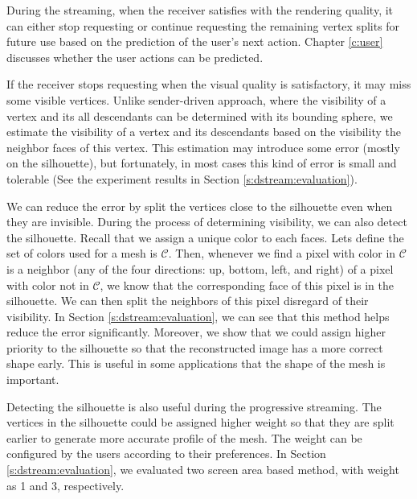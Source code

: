     During the streaming, when the receiver satisfies with the rendering quality, it 
    can either stop requesting or continue requesting the remaining vertex splits
    for future use based on the prediction of the user's next action.
    Chapter \ref{c:user} discusses whether the user actions can be predicted.

    If the receiver stops requesting %
    when the visual quality is satisfactory, it may miss some visible vertices.
    Unlike sender-driven approach, where the visibility of a vertex and its all descendants
    can be determined with its bounding sphere, we estimate the visibility of 
    a vertex and its descendants based on the visibility the neighbor faces of this vertex. 
    This estimation may introduce some error (mostly on the silhouette), 
    but fortunately, in most cases this kind of error is small and tolerable
    (See the experiment results in Section \ref{s:dstream:evaluation}).

    We can reduce the error by split the vertices close to the silhouette even 
    when they are invisible. During the process of determining visibility, we can also
    detect the silhouette. Recall that we assign a unique color to each faces.
    Lets define the set of colors used for a mesh is $\mathcal{C}$.  
    Then, whenever we find a pixel with color in $\mathcal{C}$ 
    is a neighbor (any of the four directions: up, bottom, left, and right)
    of a pixel with color not in $\mathcal{C}$, 
    we know that the corresponding face of this pixel is in the silhouette.
    We can then split the neighbors of this pixel disregard of their visibility.
    In Section \ref{s:dstream:evaluation}, we can see that this method helps
    reduce the error significantly. Moreover, we show that we could assign
    higher priority to the silhouette so that the reconstructed image has 
    a more correct shape early. This is useful in some applications that the
    shape of the mesh is important.

    Detecting the silhouette is also useful during the progressive streaming.
    The vertices in the silhouette could be assigned higher weight so that
    they are split earlier to generate more accurate profile of the mesh.
    The weight can be configured by the users according to their preferences.
    In Section \ref{s:dstream:evaluation}, we evaluated two screen area based
    method, with weight as 1 and 3, respectively.

